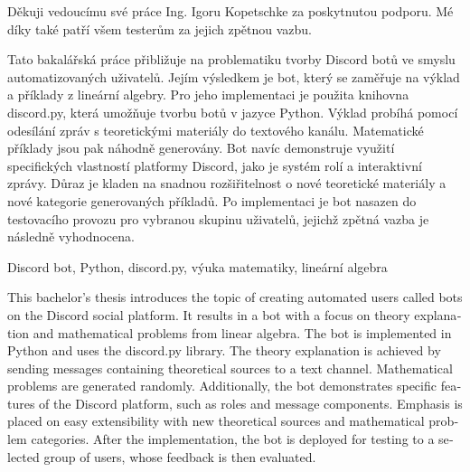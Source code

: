 \documentclass[FM]{tulthesis}
\begin{document}
	
	\begin{acknowledgement}
		Děkuji vedoucímu své práce Ing. Igoru Kopetschke za poskytnutou podporu. Mé díky také patří všem testerům za jejich zpětnou vazbu.
	\end{acknowledgement}
	
	\begin{abstractCZ}
		Tato bakalářská práce přibližuje na problematiku tvorby Discord botů ve smyslu automatizovaných uživatelů. Jejím výsledkem je bot, který se zaměřuje na výklad a příklady z lineární algebry. Pro jeho implementaci je použita knihovna discord.py, která umožňuje tvorbu botů v jazyce Python. Výklad probíhá pomocí odesílání zpráv s teoretickými materiály do textového kanálu. Matematické příklady jsou pak náhodně generovány. Bot navíc demonstruje využití specifických vlastností platformy Discord, jako je systém rolí a interaktivní zprávy. Důraz je kladen na snadnou  rozšiřitelnost o nové teoretické materiály a nové kategorie generovaných příkladů. Po implementaci je bot nasazen do testovacího provozu pro vybranou skupinu uživatelů, jejichž zpětná vazba je následně vyhodnocena.
	\end{abstractCZ}
	
	\begin{keywordsCZ}
		Discord bot, Python, discord.py, výuka matematiky, lineární algebra
	\end{keywordsCZ}
	\clearpage
	
	\begin{abstractEN}		
		\begin{english}
			This bachelor's thesis introduces the topic of creating automated users called bots on the Discord social platform. It results in a bot with a focus on theory explanation and mathematical problems from linear algebra. The bot is implemented in Python and uses the discord.py library. The theory explanation is achieved by sending messages containing theoretical sources to a text channel. Mathematical problems are generated randomly. Additionally, the bot demonstrates specific features of the Discord platform, such as roles and message components. Emphasis is placed on easy extensibility with new theoretical sources and mathematical problem categories. After the implementation, the bot is deployed for testing to a selected group of users, whose feedback is then evaluated.
		\end{english}
	\end{abstractEN}
	
\end{document}

